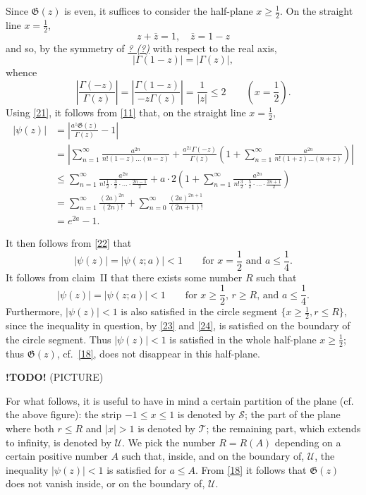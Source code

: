 \documentclass{article}
\newcommand{\GG}{\mathfrak{G}}
\newcommand{\UU}{\mathscr{U}}
\newcommand{\TT}{\mathscr{T}}
\renewcommand{\SS}{\mathscr{S}}
\renewcommand{\geq}{\geqslant}
\renewcommand{\leq}{\leqslant}
\newcommand{\todo}{\textbf{ !TODO! }}
\newcommand{\unsure}[1]{\underline{\emph{#1 (?)}}}
\newcommand{\oldpage}[1]{\marginpar{\phantom{.}\\\footnotesize$\Big\vert$ \textit{p.~#1}}}
\begin{document}
\begin{enumerate}[I.]
    Since $\GG(z)$ is even, it suffices to consider the half-plane $x\geq\frac12$.
    On the straight line $x=\frac12$,
    \[
      z+\overline{z} = 1,
      \quad \overline{z} = 1-z
    \]
    and so, by the symmetry of \unsure{?} with respect to the real axis,
    \[
      |\Gamma(1-z)| = |\Gamma(z)|,
    \]
    whence
    \[
      \left\vert
        \frac{\Gamma(-z)}{\Gamma(z)}
      \right\vert = \left\vert
        \frac{\Gamma(1-z)}{-z\Gamma(z)}
      \right\vert = \frac{1}{|z|} \leq 2
      \qquad\left(
        x=\frac12
      \right).
    \]
    Using \cref{21}, it follows from \cref{11} that, on the straight line $x=\frac12$,
    \[
    \label{22}
      \begin{aligned}
        |\psi(z)|
        &= \left\vert
          \frac{a^z\GG(z)}{\Gamma(z)} - 1
        \right\vert
      \\&= \left\vert
          \sum_{n=1}^\infty \frac{a^{2n}}{n!(1-z)\ldots(n-z)}
          + \frac{a^{2z}\Gamma(-z)}{\Gamma(z)} \left(
            1 + \sum_{n=1}^\infty \frac{a^{2n}}{n!(1+z)\ldots(n+z)}
          \right)
        \right\vert
      \\&\leq \sum_{n=1}^\infty \frac{a^{2n}}{n!\frac12\cdot\frac32\cdot\ldots\cdot\frac{2n-1}{2}} + a\cdot2 \left(
        1 + \sum_{n=1}^\infty \frac{a^{2n}}{n!\frac32\cdot\frac52\cdot\ldots\cdot\frac{2n+1}{2}}
      \right)
      \\&= \sum_{n=1}^\infty \frac{(2a)^{2n}}{(2n)!} + \sum_{n=0}^\infty \frac{(2a)^{2n+1}}{(2n+1)!}
      \\&= e^{2a}-1.
      \end{aligned}
    \tag{22}
    \]

  \oldpage{311}
    It then follows from \cref{22} that
    \[
    \label{23}
      |\psi(z)| = |\psi(z;a)| < 1
      \qquad\mbox{for $x=\frac12$ and $a\leq\frac14$.}
    \tag{23}
    \]
    It follows from claim~II that there exists some number $R$ such that
    \[
    \label{24}
      |\psi(z)| = |\psi(z;a)| <1
      \qquad\mbox{for $x\geq\frac12$, $r\geq R$, and $a\leq\frac14$.}
    \tag{24}
    \]
    Furthermore, $|\psi(z)|<1$ is also satisfied in the circle segment $\{x\geq\frac12,r\leq R\}$, since the inequality in question, by \cref{23} and \cref{24}, is satisfied on the boundary of the circle segment.
    Thus $|\psi(z)|<1$ is satisfied in the whole half-plane $x\geq\frac12$;
    thus $\GG(z)$, cf.~\cref{18}, does not disappear in this half-plane.

    \todo (PICTURE)

    For what follows, it is useful to have in mind a certain partition of the plane (cf. the above figure): the strip $-1\leq x\leq 1$ is denoted by $\SS$; the part of the plane where both $r\leq R$ and $|x|>1$ is denoted by $\TT$; the remaining part, which extends to infinity, is denoted by $\UU$.
    We pick the number $R=R(A)$ depending on a certain positive number $A$ such that, inside, and on the boundary of, $\UU$, the inequality $|\psi(z)|<1$ is satisfied for $a\leq A$.
    From \cref{18} it follows that $\GG(z)$ does not vanish inside, or on the boundary of, $\UU$.
\end{enumerate}
\end{document}
